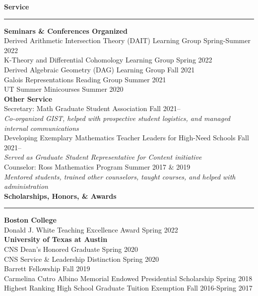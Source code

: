 \documentclass[11pt]{article}
\newenvironment{mysection}{
\color{mygreen}\bfseries\large
}
{
\\ \rule{\textwidth}{1pt}\hspace{-.25em}
} %
\begin{document}
\begin{mysection}Service \end{mysection}
\textbf{Seminars \& Conferences Organized} \\
Derived Arithmetic Intersection Theory (DAIT) Learning Group \hfill Spring-Summer 2022 \\
K-Theory and Differential Cohomology Learning Group \hfill Spring 2022 \\
Derived Algebraic Geometry (DAG) Learning Group \hfill Fall 2021 \\
Galois Representations Reading Group \hfill Summer 2021 \\
UT Summer Minicourses \hfill Summer 2020 \\

\textbf{Other Service} \\
Secretary: Math Graduate Student Association \hfill Fall 2021-- \\
\textit{Co-organized GIST, helped with prospective student logistics, and managed internal communications} \\
Developing Exemplary Mathematics Teacher Leaders for High-Need Schools \hfill Fall 2021--\\
\textit{Served as Graduate Student Representative for Content initiative} \\
Counselor: Ross Mathematics Program \hfill Summer 2017 \& 2019 \\
\textit{Mentored students, trained other counselors, taught courses, and helped with administration} \\

\begin{mysection}Scholarships, Honors, \& Awards\end{mysection}
\textbf{Boston College} \\
Donald J. White Teaching Excellence Award \hfill Spring 2022 \\

\textbf{University of Texas at Austin} \\
CNS Dean's Honored Graduate \hfill Spring 2020 \\
CNS Service \& Leadership Distinction \hfill Spring 2020 \\
Barrett Fellowship \hfill Fall 2019 \\
Carmelina Cutro Albino Memorial Endowed Presidential Scholarship \hfill Spring 2018 \\
Highest Ranking High School Graduate Tuition Exemption \hfill Fall 2016-Spring 2017 \\
\end{document}
